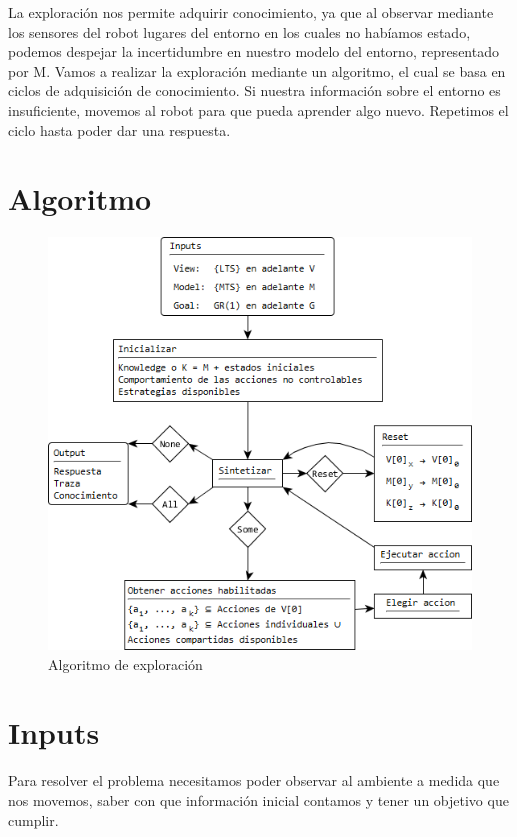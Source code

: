 \vspace{\baselineskip}
La exploración nos permite adquirir conocimiento, ya que al observar mediante los sensores del robot lugares del entorno en los cuales
no habíamos estado, podemos despejar la incertidumbre en nuestro modelo del entorno, representado por M. Vamos a realizar la exploración
mediante un algoritmo, el cual se basa en ciclos de adquisición de conocimiento. Si nuestra información sobre el entorno es insuficiente,
movemos al robot para que pueda aprender algo nuevo. Repetimos el ciclo hasta poder dar una respuesta.

\section{Algoritmo}

\begin{figure}[H]
  \centering
    \includegraphics{Imagenes/Algoritmo/Algoritmo.png}
  \caption{Algoritmo de exploración}
  \label{fig:Algoritmo}
\end{figure}

\section{Inputs}

Para resolver el problema necesitamos poder observar al ambiente a medida que nos movemos, saber con que información inicial 
contamos y tener un objetivo que cumplir.

